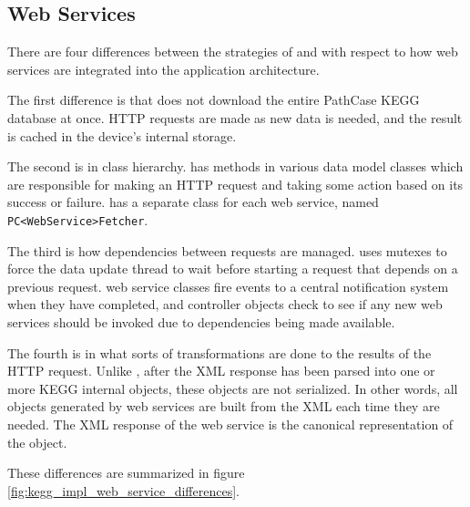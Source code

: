 \subsection{Web Services}
\label{sect:kegg_impl_web_services}

There are four differences between the strategies of \mawapp and \keggapp
with respect to how web services are integrated into the application
architecture.

The first difference is that \keggapp does not download the entire PathCase
KEGG database at once. HTTP requests are made as new data is needed, and the
result is cached in the device's internal storage.

The second is in class hierarchy. \mawapp has methods in various data model
classes which are responsible for making an HTTP request and taking some action
based on its success or failure. \keggapp has a separate class for each web
service, named \texttt{PC<WebService>Fetcher}.

The third is how dependencies between requests are managed. \mawapp uses
mutexes to force the data update thread to wait before starting a request that
depends on a previous request. \keggappp web service classes fire events to
a central notification system when they have completed, and controller objects
check to see if any new web services should be invoked due to dependencies being
made available.

The fourth is in what sorts of transformations are done to the results of the
HTTP request. Unlike \mawapp, after the XML response has been parsed into
one or more KEGG internal objects, these objects are not serialized. In other
words, all objects generated by web services are built from the XML each time
they are needed. The XML response of the web service is the canonical
representation of the object.

These differences are summarized in figure
\ref{fig:kegg_impl_web_service_differences}.

